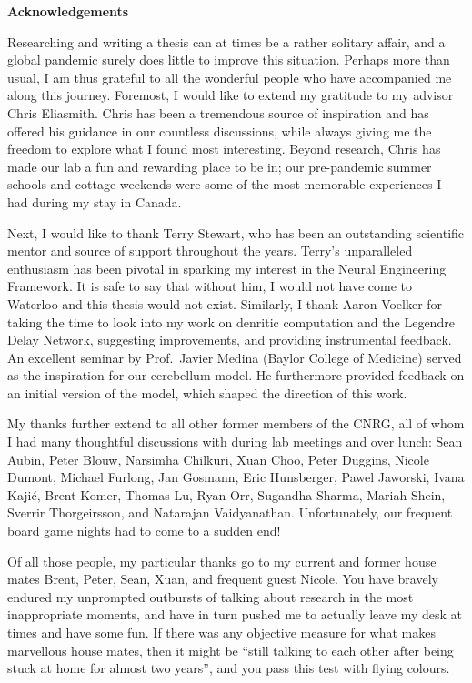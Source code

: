 \begin{center}\textbf{Acknowledgements}\end{center}

Researching and writing a thesis can at times be a rather solitary affair, and a global pandemic surely does little to improve this situation.
Perhaps more than usual, I am thus grateful to all the wonderful people who have accompanied me along this journey.
Foremost, I would like to extend my gratitude to my advisor Chris Eliasmith.
Chris has been a tremendous source of inspiration and has offered his guidance in our countless discussions, while always giving me the freedom to explore what I found most interesting.
Beyond research, Chris has made our lab a fun and rewarding place to be in; our pre-pandemic summer schools and cottage weekends were some of the most memorable experiences I had during my stay in Canada.

Next, I would like to thank Terry Stewart, who has been an outstanding scientific mentor and source of support throughout the years.
Terry's unparalleled enthusiasm has been pivotal in sparking my interest in the Neural Engineering Framework.
It is safe to say that without him, I would not have come to Waterloo and this thesis would not exist.
Similarly, I thank Aaron Voelker for taking the time to look into my work on denritic computation and the Legendre Delay Network, suggesting improvements, and providing instrumental feedback.
An excellent seminar by Prof.~Javier Medina (Baylor College of Medicine) served as the inspiration for our cerebellum model.
He furthermore provided feedback on an initial version of the model, which shaped the direction of this work.

My thanks further extend to all other former members of the CNRG, all of whom I had many thoughtful discussions with during lab meetings and over lunch: Sean Aubin, Peter Blouw, Narsimha Chilkuri, Xuan Choo, Peter Duggins, Nicole Dumont, Michael Furlong, Jan Gosmann, Eric Hunsberger, Pawel Jaworski, Ivana Kajić, Brent Komer, Thomas Lu, Ryan Orr, Sugandha Sharma, Mariah Shein, Sverrir Thorgeirsson, and Natarajan Vaidyanathan.
Unfortunately, our frequent board game nights had to come to a sudden end!

Of all those people, my particular thanks go to my current and former house mates Brent, Peter, Sean, Xuan, and frequent guest Nicole.
You have bravely endured my unprompted outbursts of talking about research in the most inappropriate moments, and have in turn pushed me to actually leave my desk at times and have some fun.
If there was any objective measure for what makes marvellous house mates, then it might be \enquote{still talking to each other after being stuck at home for almost two years}, and you pass this test with flying colours.

